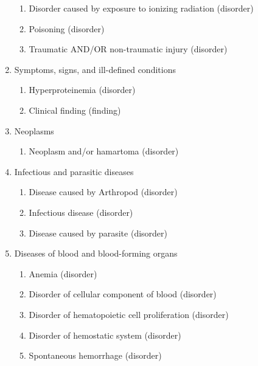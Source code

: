 \documentclass{article}[11pt,oneside]
\begin{document}
\begin{multicols}{2}
\begin{enumerate}
 \begin{enumerate} 
 \item Disorder caused by exposure to ionizing radiation (disorder) 
 \item Poisoning (disorder)  %
 \item Traumatic AND/OR non-traumatic injury (disorder)  %
 \end{enumerate} 
\item Symptoms, signs, and ill-defined conditions 
 \begin{enumerate} 
 \item Hyperproteinemia (disorder) %
 \item Clinical finding (finding)  %
 \end{enumerate} 
\item Neoplasms 
 \begin{enumerate} 
 \item Neoplasm and/or hamartoma (disorder) %
 \end{enumerate} 
\item Infectious and parasitic diseases 
 \begin{enumerate} 
 \item Disease caused by Arthropod (disorder) %
 \item Infectious disease (disorder) %
 \item Disease caused by parasite (disorder) %
 \end{enumerate} 
\item Diseases of blood and blood-forming organs 
 \begin{enumerate} 
 \item Anemia (disorder) %
 \item Disorder of cellular component of blood (disorder) %
 \item Disorder of hematopoietic cell proliferation (disorder) %
 \item Disorder of hemostatic system (disorder) %
 \item Spontaneous hemorrhage (disorder) %

\end{enumerate}
\end{enumerate}
\end{multicols}
\end{document}
